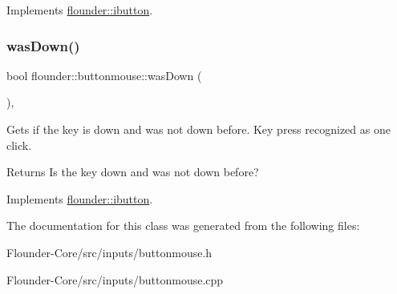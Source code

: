 Implements \hyperlink{classflounder_1_1ibutton_af99b936d7329f74a27768ce6eb181327}{flounder\+::ibutton}.

\mbox{\label{classflounder_1_1buttonmouse_a7dad01481ebb01755db054a0acbc8159}} 
\subsubsection{\texorpdfstring{was\+Down()}{wasDown()}}
{\footnotesize\ttfamily bool flounder\+::buttonmouse\+::was\+Down (\begin{DoxyParamCaption}{ }\end{DoxyParamCaption})\hspace{0.3cm}{\ttfamily [override]}, {\ttfamily [virtual]}}



Gets if the key is down and was not down before. Key press recognized as one click. 

\begin{DoxyReturn}{Returns}
Is the key down and was not down before? 
\end{DoxyReturn}


Implements \hyperlink{classflounder_1_1ibutton_a5fb7b3493c0ea0e67bb9defc272da0d3}{flounder\+::ibutton}.



The documentation for this class was generated from the following files\+:\begin{DoxyCompactItemize}
\item 
Flounder-\/\+Core/src/inputs/buttonmouse.\+h\item 
Flounder-\/\+Core/src/inputs/buttonmouse.\+cpp\end{DoxyCompactItemize}

